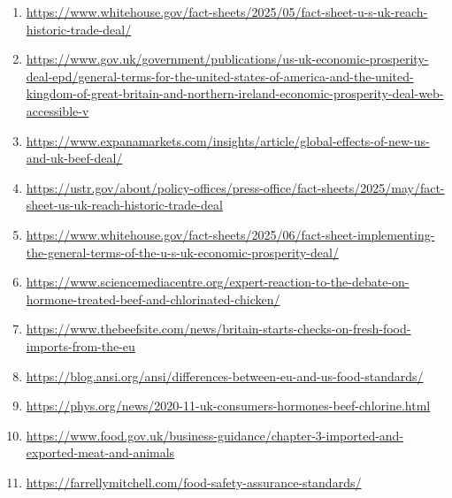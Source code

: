 \documentclass[10pt,a4paper]{article}
\begin{document}
\begin{enumerate}[leftmargin=*]
            \item \url{ https://www.whitehouse.gov/fact-sheets/2025/05/fact-sheet-u-s-uk-reach-historic-trade-deal/ }
            \item \url{ https://www.gov.uk/government/publications/us-uk-economic-prosperity-deal-epd/general-terms-for-the-united-states-of-america-and-the-united-kingdom-of-great-britain-and-northern-ireland-economic-prosperity-deal-web-accessible-v }
            \item \url{ https://www.expanamarkets.com/insights/article/global-effects-of-new-us-and-uk-beef-deal/ }
            \item \url{ https://ustr.gov/about/policy-offices/press-office/fact-sheets/2025/may/fact-sheet-us-uk-reach-historic-trade-deal }
            \item \url{ https://www.whitehouse.gov/fact-sheets/2025/06/fact-sheet-implementing-the-general-terms-of-the-u-s-uk-economic-prosperity-deal/ }
            \item \url{ https://www.sciencemediacentre.org/expert-reaction-to-the-debate-on-hormone-treated-beef-and-chlorinated-chicken/ }
            \item \url{ https://www.thebeefsite.com/news/britain-starts-checks-on-fresh-food-imports-from-the-eu }
            \item \url{ https://blog.ansi.org/ansi/differences-between-eu-and-us-food-standards/ }
            \item \url{ https://phys.org/news/2020-11-uk-consumers-hormones-beef-chlorine.html }
            \item \url{ https://www.food.gov.uk/business-guidance/chapter-3-imported-and-exported-meat-and-animals }
            \item \url{ https://farrellymitchell.com/food-safety-assurance-standards/ }
    \end{enumerate}
\vspace{1em}
\end{document}
